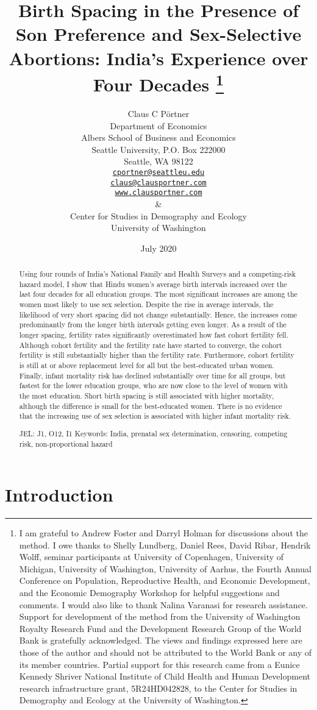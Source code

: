 \documentclass[12pt,letterpaper]{article}
\title{Birth Spacing in the Presence of Son Preference and Sex-Selective Abortions:
India's Experience over Four Decades%
\protect\thanks{%
I am grateful to Andrew Foster and Darryl Holman for discussions about the method.
I owe thanks to Shelly Lundberg, Daniel Rees, David Ribar, 
Hendrik Wolff, seminar participants at University of Copenhagen, University of Michigan, 
University of Washington, University of Aarhus, the Fourth 
Annual Conference on Population, Reproductive Health, 
and Economic Development, and the Economic Demography Workshop for helpful 
suggestions and comments.
I would also like to thank Nalina Varanasi for research assistance.
Support for development of the method from the University of Washington Royalty 
Research Fund and the Development Research Group of the World Bank is gratefully 
acknowledged.
The views and findings expressed here are those of the author and
should not be attributed to the World Bank or any of its member countries.
Partial support for this research came from a Eunice Kennedy Shriver National
Institute of Child Health and Human Development research infrastructure grant,
5R24HD042828, to the Center for Studies in Demography and Ecology at the
University of Washington.
}
}
\author{Claus C P\"ortner\\
    Department of Economics\\
    Albers School of Business and Economics\\
    Seattle University, P.O. Box 222000\\
    Seattle, WA 98122\\
    \href{mailto:cportner@seattleu.edu}{\texttt{cportner@seattleu.edu}}\\
    \href{mailto:claus@clausportner.com}{\texttt{claus@clausportner.com}}\\
    \href{http://www.clausportner.com}{\texttt{www.clausportner.com}}\\
    \& \\
    Center for Studies in Demography and Ecology \\
    University of Washington\\ \vspace{2cm}
    }
\date{July 2020}
\begin{document}
\graphicspath{{../figures/}}

\setcounter{page}{-1}
\maketitle
\thispagestyle{empty}



\newpage
\thispagestyle{empty}
\doublespacing

\begin{abstract}

\noindent 
Using four rounds of India's National Family and Health Surveys and a
competing-risk hazard model, I show that Hindu women's average birth intervals
increased over the last four decades for all education groups. The most
significant increases are among the women most likely to use sex
selection. Despite the rise in average intervals, the likelihood of very
short spacing did not change substantially. Hence, the increases come
predominantly from the longer birth intervals getting even longer. As a
result of the longer spacing, fertility rates significantly
overestimated how fast cohort fertility fell. Although cohort fertility
and the fertility rate have started to converge, the cohort fertility is
still substantially higher than the fertility rate. Furthermore, cohort
fertility is still at or above replacement level for all but the
best-educated urban women. Finally, infant mortality risk has declined
substantially over time for all groups, but fastest for the lower
education groups, who are now close to the level of women with the most
education. Short birth spacing is still associated with higher
mortality, although the difference is small for the best-educated women.
There is no evidence that the increasing use of sex selection is
associated with higher infant mortality risk.

\noindent JEL: J1, O12, I1
\noindent Keywords: India, prenatal sex determination, censoring, competing risk, non-proportional hazard
\end{abstract}

\newpage



\section{Introduction\label{sec:intro}}
\end{document}
